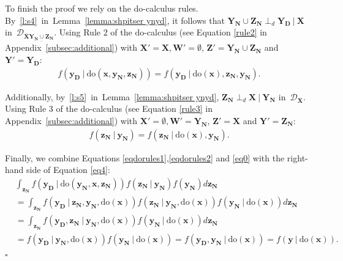 \documentclass[11pt,a4paper]{article}
\newcommand{\ddo}{\textrm{do}}
\newcommand\given[1][]{\:#1\vert\:}
\newcommand{\dsepp}{\perp_{d}}
\newenvironment{proofof}[1][]{\begin{trivlist}
   \item[\hskip \labelsep {\bfseries Proof of #1.}]}{\hfill{}$\square$\end{trivlist}}
\newcommand{\g}[1][G]{\mathcal{#1}}
\begin{document}
\begin{proofof}[Theorem~\ref{theorem:soundness ac}]
To finish the proof we rely on the $\ddo$-calculus rules. By~\ref{l:s4}~in~Lemma~\ref{lemma:shpitser ynyd}, it follows that
$\mathbf{Y_N} \cup\mathbf{Z_N} \dsepp \mathbf{Y_D} \given \mathbf{X}$ in~$\g[D]_{\overline{\mathbf{X}}\underline{\mathbf{Y_N} \cup  \mathbf{Z_N}}}$.
Using Rule 2 of the $\ddo$-calculus (see Equation \ref{rule2} in Appendix~\ref{subsec:additional}) with $\mathbf{X'} = \mathbf{X}, \mathbf{W'} = \emptyset$, $\mathbf{Z'} = \mathbf{Y_N} \cup \mathbf{Z_N}$ and $\mathbf{Y'} = \mathbf{Y_D}$:
\begin{align}
f( \mathbf{y_D} \given \ddo(\mathbf{x,y_N,z_N})) = f( \mathbf{y_D} \given \ddo(\mathbf{x}),\mathbf{z_N,y_N}).
\label{eqdorules1}
\end{align}

\noindent{}Additionally, by~\ref{l:s5}~in~Lemma~\ref{lemma:shpitser ynyd}, $\mathbf{Z_N} \dsepp \mathbf{X} \given \mathbf{Y_N}$ in~$\g[D]_{\overline{\mathbf{X}}}$. Using Rule 3 of the $\ddo$-calculus (see Equation \ref{rule3} in Appendix~\ref{subsec:additional}) with $\mathbf{X'} = \emptyset, \mathbf{W'} = \mathbf{Y_N}$, $\mathbf{Z'} = \mathbf{X}$ and $\mathbf{Y'} = \mathbf{Z_N}$:
\begin{align}
f(\mathbf{z_N} \given \mathbf{y_N}) =  f(\mathbf{z_N} \given  \ddo(\mathbf{x}),\mathbf{y_N}).
\label{eqdorules2}
\end{align}

\noindent{}Finally, we combine Equations \eqref{eqdorules1},\eqref{eqdorules2} and \eqref{eq0} with the right-hand side of Equation \eqref{eq4}:
\begin{align}
& \int_{\mathbf{z_N}}  f( \mathbf{y_D} \given \ddo(\mathbf{y_N,x,z_N})) f(\mathbf{z_N} \given \mathbf{y_N}) f(\mathbf{y_N}) d\mathbf{z_N} \nonumber  \\
&= \int_{\mathbf{z_N}} f( \mathbf{y_D} \given \mathbf{z_N,y_N}, \ddo(\mathbf{x}))  f(\mathbf{z_N} \given \mathbf{y_N}, \ddo(\mathbf{x})) f(\mathbf{y_N} \given \ddo(\mathbf{x})) d\mathbf{z_N} \nonumber \\
&= \int_{\mathbf{z_N}} f( \mathbf{y_D,z_N} \given \mathbf{y_N}, \ddo(\mathbf{x}))   f(\mathbf{y_N} \given \ddo(\mathbf{x})) d\mathbf{z_N} \nonumber \\
&= f( \mathbf{y_D} \given \mathbf{y_N}, \ddo(\mathbf{x}))   f(\mathbf{y_N} \given \ddo(\mathbf{x})) =f(\mathbf{y_D,y_N} \given \ddo(\mathbf{x})) = f(\mathbf{y} \given \ddo(\mathbf{x})).  \nonumber
\end{align}
\end{proofof}
\end{document}
